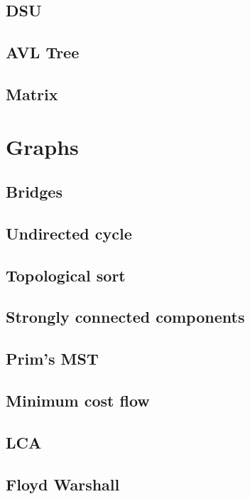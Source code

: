 \documentclass[10pt]{extarticle}
\begin{document}
\begin{multicols*}{3}
\subsection{DSU}


\subsection{AVL Tree}


\subsection{Matrix}


\section{Graphs}

    \subsection{Bridges}
    
    \subsection{Undirected cycle}
    
    \subsection{Topological sort}
    
    \subsection{Strongly connected components}
    
    \subsection{Prim's MST}
    
    \subsection{Minimum cost flow}
    
    \subsection{LCA}
    
    \subsection{Floyd Warshall}
    

\end{multicols*}
\end{document}
